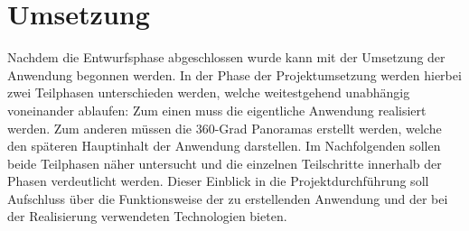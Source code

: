 \section{Umsetzung}
\label{sec:Umsetzung}

Nachdem die Entwurfsphase abgeschlossen wurde kann  mit der Umsetzung der
Anwendung begonnen werden. In der Phase der Projektumsetzung werden hierbei
zwei Teilphasen unterschieden werden, welche weitestgehend unabhängig
voneinander ablaufen: Zum einen muss die eigentliche Anwendung realisiert
werden. Zum anderen müssen die 360-Grad Panoramas erstellt werden, welche den
späteren Hauptinhalt der Anwendung darstellen. Im Nachfolgenden sollen beide
Teilphasen näher untersucht und die einzelnen Teilschritte innerhalb der Phasen
verdeutlicht werden. Dieser Einblick in die Projektdurchführung soll Aufschluss
über die Funktionsweise der zu erstellenden Anwendung und der bei der
Realisierung verwendeten Technologien bieten.



